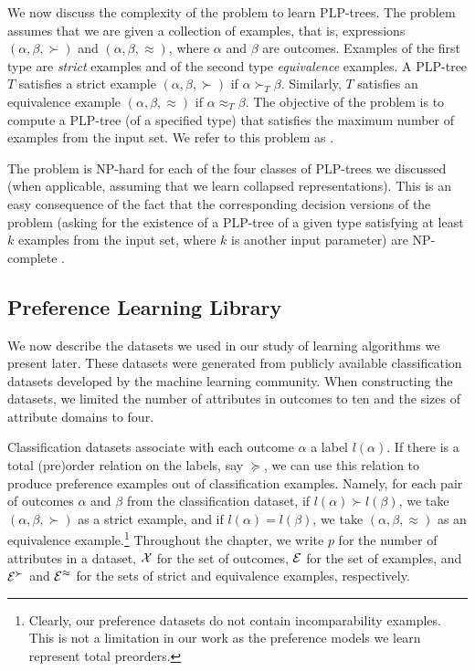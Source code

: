 We now discuss the complexity of the problem to learn
PLP-trees. The problem assumes that we are given a collection of examples,
that is, expressions $(\alpha,\beta,\succ)$ and $(\alpha,\beta,\approx)$,
where $\alpha$ and $\beta$ are outcomes. Examples of the first type are
\emph{strict} examples and of the second type \emph{equivalence} examples.
A PLP-tree $T$ satisfies a strict example $(\alpha,\beta,\succ)$ if $\alpha
\succ_T \beta$. Similarly, $T$ satisfies an equivalence example $(\alpha,
\beta,\approx)$ if $\alpha\approx_T\beta$. The objective of the problem
is to compute a PLP-tree (of a specified type) that satisfies the maximum
number of examples from the input set. We refer to this problem as
.

The  problem is NP-hard for each of the four classes of
PLP-trees we discussed (when applicable, assuming that we learn collapsed
representations). This is an easy consequence of the fact that the
corresponding decision versions of the problem (asking for the existence
of a PLP-tree of a given type satisfying at least $k$ examples from the
input set, where $k$ is another input parameter) are NP-complete
\cite{conf/aaai15/LiuT}.

\subsection{Preference Learning Library}
\label{sec:library}
We now describe the datasets we used in our study of learning algorithms
we present later. These datasets were generated from publicly available 
classification datasets developed by the machine learning community. 
When constructing the datasets, we limited the number of attributes 
in outcomes to ten and the sizes of attribute domains to four. 

Classification datasets associate with each outcome $\alpha$ a label
$l(\alpha)$. If there is a total (pre)order relation on the labels, say
$\succeq$, we can use this relation to produce preference examples out of
classification examples. Namely, for each pair of outcomes $\alpha$ and $\beta$
from the classification dataset, if $l(\alpha) \succ l(\beta)$, we take 
$(\alpha,\beta,\succ)$ as a strict example, and if $l(\alpha)= l(\beta)$, 
we take $(\alpha,\beta,\approx)$ as an equivalence example.\footnote{Clearly, 
our preference datasets do not contain incomparability examples. This is not 
a limitation in our work as the preference models we learn represent total 
preorders.} Throughout the chapter, we write $p$ for the number of attributes
in a dataset, $\mathcal{X}$ for the set of outcomes, $\mathcal{E}$ for the set of examples, 
and $\mathcal{E}^{\succ}$ and $\mathcal{E}^{\approx}$ for the sets of strict and equivalence
examples, respectively.

